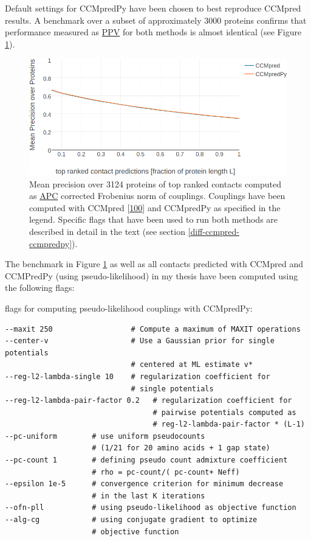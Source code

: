 \documentclass[11pt,a4paper,twoside]{book}
\theoremstyle{definition}
\theoremstyle{definition}
\theoremstyle{remark}
\begin{document}
Default settings for CCMpredPy have been chosen to best reproduce
CCMpred results. A benchmark over a subset of approximately 3000
proteins confirms that performance measured as
\protect\hyperlink{abbrev}{PPV} for both methods is almost identical
(see Figure \ref{fig:cmmpredvanilla-vs-ccmpredpy}).










\begin{figure}
\includegraphics[width=1\linewidth]{img/methods/ccmpredvanilla_vs_ccmpredpy_precision_vs_rank} \caption{Mean precision over 3124
proteins of top ranked contacts computed as
\protect\hyperlink{abbrev}{APC} corrected Frobenius norm of couplings.
Couplings have been computed with CCMpred
{[}\protect\hyperlink{ref-Seemayer2014}{100}{]} and CCMpredPy as
specified in the legend. Specific flags that have been used to run both
methods are described in detail in the text (see section
\ref{diff-ccmpred-ccmpredpy}).}\label{fig:cmmpredvanilla-vs-ccmpredpy}
\end{figure}

The benchmark in Figure \ref{fig:cmmpredvanilla-vs-ccmpredpy} as well as
all contacts predicted with CCMpred and CCMPredPy (using
pseudo-likelihood) in my thesis have been computed using the following
flags:

flags for computing pseudo-likelihood couplings with CCMpredPy:

\begin{verbatim}
--maxit 250                  # Compute a maximum of MAXIT operations
--center-v                   # Use a Gaussian prior for single potentials 
                             # centered at ML estimate v*          
--reg-l2-lambda-single 10    # regularization coefficient for 
                             # single potentials
--reg-l2-lambda-pair-factor 0.2   # regularization coefficient for 
                                  # pairwise potentials computed as 
                                  # reg-l2-lambda-pair-factor * (L-1)
--pc-uniform        # use uniform pseudocounts 
                    # (1/21 for 20 amino acids + 1 gap state) 
--pc-count 1        # defining pseudo count admixture coefficient 
                    # rho = pc-count/( pc-count+ Neff)
--epsilon 1e-5      # convergence criterion for minimum decrease 
                    # in the last K iterations
--ofn-pll           # using pseudo-likelihood as objective function
--alg-cg            # using conjugate gradient to optimize 
                    # objective function
\end{verbatim}
\end{document}
